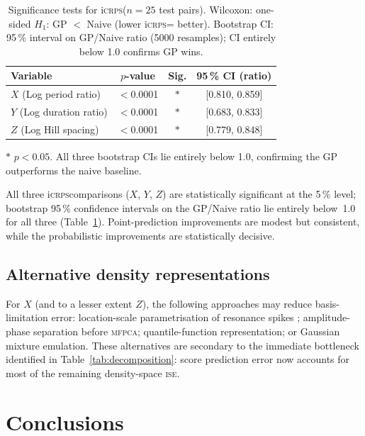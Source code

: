 \documentclass[12pt,a4paper]{article}
\newcommand{\MFPCA}{\textsc{mfpca}}
\newcommand{\ISE}{\textsc{ise}}
\newcommand{\iCRPS}{i\textsc{crps}}
\begin{document}
\begin{table}[htbp]
  \centering
  \caption{Significance tests for \iCRPS ($n=25$ test pairs).
           Wilcoxon: one-sided $H_1$: GP $<$ Naive
           (lower \iCRPS = better).
           Bootstrap CI: 95\,\% interval on GP/Naive ratio
           (5000 resamples); CI entirely below 1.0 confirms GP wins.}
  \label{tab:stat_tests}
  \begin{tabular}{lccc}
    \toprule
    Variable & $p$-value & Sig. & 95\,\% CI (ratio) \\
    \midrule
    $X$ (Log period ratio)   & $<$0.0001 & $*$ & [0.810, 0.859] \\
    $Y$ (Log duration ratio) & $<$0.0001 & $*$ & [0.683, 0.833] \\
    $Z$ (Log Hill spacing)   & $<$0.0001 & $*$ & [0.779, 0.848] \\
    \bottomrule
  \end{tabular}

  \smallskip
  {\small $*$ $p<0.05$.  All three bootstrap CIs lie entirely below
  1.0, confirming the GP outperforms the naive baseline.}
\end{table}

All three \iCRPS comparisons ($X$, $Y$, $Z$) are statistically
significant at the 5\,\% level; bootstrap 95\,\% confidence intervals
on the GP/Naive ratio lie entirely below~1.0 for all three
(Table~\ref{tab:stat_tests}).  Point-prediction improvements are
modest but consistent, while the probabilistic improvements are
statistically decisive.

\subsection{Alternative density representations}
\label{sec:alternatives}

For $X$ (and to a lesser extent $Z$), the following approaches may
reduce basis-limitation error: location-scale parametrisation of
resonance spikes \citep{ma2011}; amplitude-phase separation before
\MFPCA \citep{ramsay2005, kurtek2011}; quantile-function
representation; or Gaussian mixture emulation.  These alternatives are
secondary to the immediate bottleneck identified in
Table~\ref{tab:decomposition}: score prediction error now accounts for
most of the remaining density-space \ISE.

\section{Conclusions}
\label{sec:conclusions}
\end{document}
